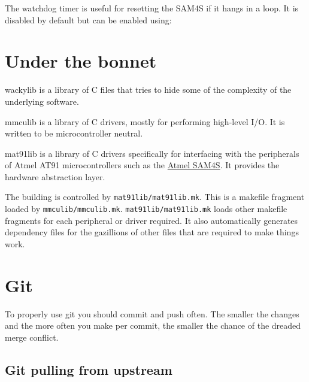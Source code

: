 The watchdog timer is useful for resetting the SAM4S if it hangs in a
loop.  It is disabled by default but can be enabled using:
%
\begin{Shaded}
\begin{Highlighting}[]

\NormalTok{)}
\NormalTok{\{}
   
    \NormalTok{ (}\NormalTok{)}
\NormalTok{    \{}

\NormalTok{    \}}
\NormalTok{\}}
\end{Highlighting}
\end{Shaded}

\section{Under the bonnet}
\label{under-the-bonnet}

wackylib is a library of C files that tries to hide some of the
complexity of the underlying software.

mmculib is a library of C drivers, mostly for performing high-level I/O.
It is written to be microcontroller neutral.

mat91lib is a library of C drivers specifically for interfacing with the
peripherals of Atmel AT91 microcontrollers such as the
\href{Atmel_SAM4S}{Atmel SAM4S}. It provides the hardware abstraction
layer.

The building is controlled by \texttt{mat91lib/mat91lib.mk}. This is a
makefile fragment loaded by \texttt{mmculib/mmculib.mk}.
\texttt{mat91lib/mat91lib.mk} loads other makefile fragments for each
peripheral or driver required. It also automatically generates
dependency files for the gazillions of other files that are required to
make things work.

\section{Git}
\label{git}

To properly use git you should commit and push often. The smaller the
changes and the more often you make per commit, the smaller the chance
of the dreaded merge conflict.

\subsection{Git pulling from upstream}
\label{git-pulling-from-upstream}

